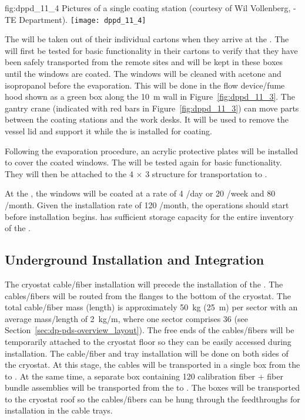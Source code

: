 \begin{dunefigure}{fig:dppd_11_4}
{Pictures of a single  coating station (courtesy of Wil Vollenberg, -TE Department).}
\texttt{[image: dppd\_11\_4]}
\end{dunefigure}

The  will be taken out of their individual cartons when they arrive at the . The  will first be tested for basic functionality in their cartons to verify that they have been safely transported from the remote sites and will be kept in these boxes until the windows are coated. The  windows will be cleaned with acetone and isopropanol before the evaporation. This will be done in the flow device/fume hood shown as a green box along the \SI{10}{\m} wall in Figure~\ref{fig:dppd_11_3}. The gantry crane (indicated with red bars in Figure~\ref{fig:dppd_11_3}) can move parts between the coating stations and the work desks. It will be used to remove the vessel lid and support it while the  is installed for coating.

Following the evaporation procedure, an acrylic protective plates will be installed to cover the coated  windows.
The  will be tested again for basic functionality. They will then be attached to the \num{4} $\times$ \num{3} structure for transportation to \surf.

At the , the  windows will be coated at a rate of \num{4} /day or \num{20} /week and \num{80} /month. Given the installation rate of \num{120} /month, the  operations should start before installation begins.  has sufficient storage capacity for the entire  inventory of the . 

\subsection{Underground Installation and Integration}
\label{subsec:dp-pds-undergroundinstallation}

The cryostat cable/fiber installation will precede the installation of the . The cables/fibers will be routed from the flanges to the bottom of the cryostat. The total cable/fiber mass (length) is approximately \SI{50}{\kg} (\SI{25}{\m}) per sector with an average mass/length of \SI{2}{\kg/\m}, where one sector comprises \num{36}  (see Section~\ref{sec:dp-pds-overview_layout}). The free ends of the cables/fibers will be temporarily attached to the cryostat floor so they can be easily accessed during installation. The cable/fiber and tray installation will be done on both sides of the cryostat. At this stage, the  cables will be transported in a single box from the  to \surf. At the same time, a separate box containing \num{120} calibration fiber + fiber bundle assemblies will be transported from the  to \surf. The boxes will be transported to the cryostat roof so the cables/fibers can be hung through the feedthroughs for installation in the cable trays.  

